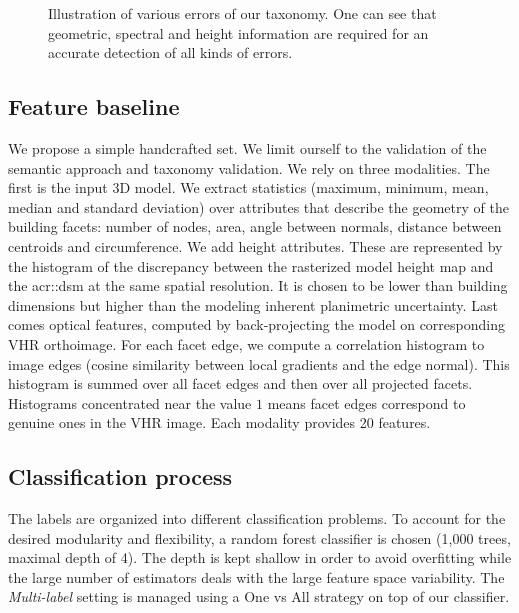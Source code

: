\documentclass[conference]{IEEEtran}
\newcounter{SubFigCounter}
\begin{document}
\begin{figure}
\begin{center}
{{                }
                {
                    \renewcommand{\thesubfigure}{\roman{SubFigCounter}}
					\vspace{-.3cm}
                    \label{fig::fac_err}
                    \addtocounter{figure}{-1}
                }
            }
            {
                \caption{\label{fig::samples}Illustration of various errors of our taxonomy. One can see that geometric, spectral and height information are required for an accurate detection of all kinds of errors.}
            }
        \end{center}
    \end{figure}

\subsection{Feature baseline}

	We propose a simple handcrafted set. We limit ourself to the validation of the semantic approach and taxonomy validation. We rely on three modalities. The first is the input 3D model. We extract statistics (maximum, minimum, mean, median and standard deviation) over attributes that describe the geometry of the building facets: number of nodes, area, angle between normals, distance between centroids and circumference. We add height attributes. These are represented by the histogram of the discrepancy between the rasterized model height map and the \acrshort{acr::dsm} at the same spatial resolution. It is chosen to be lower than building dimensions but higher than the modeling inherent planimetric uncertainty. Last comes optical features, computed by back-projecting the model on corresponding VHR orthoimage. For each facet edge, we compute a correlation histogram to image edges (cosine similarity between local gradients and the edge normal). This histogram is summed over all facet edges and then over all projected facets. Histograms concentrated near the value $1$ means facet edges correspond to genuine ones in the VHR image. Each modality provides 20 features.

\subsection{Classification process}

The labels are organized into different classification problems. To account for the desired modularity and flexibility, a random forest classifier is chosen (1,000 trees, maximal depth of 4). The depth is kept shallow in order to avoid overfitting while the large number of estimators deals with the large feature space variability. The \textit{Multi-label} setting is managed using a One vs All strategy on top of our classifier.
\end{document}
